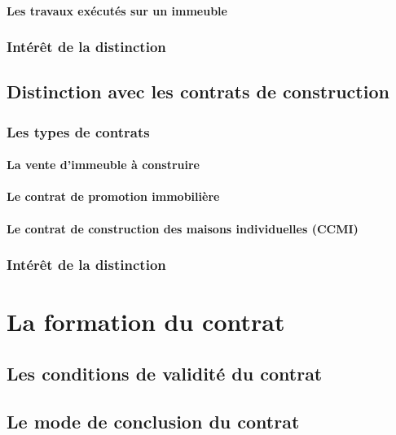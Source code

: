 				\paragraph{Les travaux exécutés sur un immeuble}
			
			\subsubsection{Intérêt de la distinction}
		
		\subsection{Distinction avec les contrats de construction}
		
			\subsubsection{Les types de contrats}
			
				\paragraph{La vente d'immeuble à construire}
				
				\paragraph{Le contrat de promotion immobilière}
				
				\paragraph{Le contrat de construction des maisons individuelles (CCMI)}
			
			\subsubsection{Intérêt de la distinction}
	
	\section{La formation du contrat}
	
		\subsection{Les conditions de validité du contrat}
		
		\subsection{Le mode de conclusion du contrat}
		
